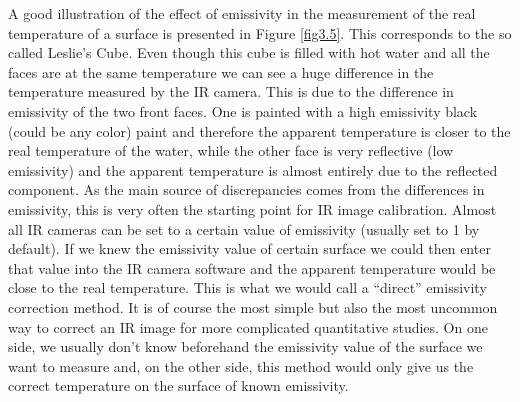 			A good illustration of the effect of emissivity in the measurement of the real temperature of a surface is presented in Figure \ref{fig3.5}. This corresponds to the so called Leslie’s Cube. Even though this cube is filled with hot water and all the faces are at the same temperature we can see a huge difference in the temperature measured by the IR camera. This is due to the difference in emissivity of the two front faces. One is painted with a high emissivity black (could be any color) paint and therefore the apparent temperature is closer to the real temperature of the water, while the other face is very reflective (low emissivity) and the apparent temperature is almost entirely due to the reflected component.
			As the main source of discrepancies comes from the differences in emissivity, this is very often the starting point for IR image calibration. Almost all IR cameras can be set to a certain value of emissivity (usually set to 1 by default). If we knew the emissivity value of certain surface we could then enter that value into the IR camera software and the apparent temperature would be close to the real temperature. This is what we would call a “direct” emissivity correction method. It is of course the most simple but also the most uncommon way to correct an IR image for more complicated quantitative studies. On one side, we usually don’t know beforehand the emissivity value of the surface we want to measure and, on the other side, this method would only give us the correct temperature on the surface of known emissivity.
			
